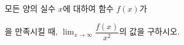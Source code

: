 모든 양의 실수 $x$에 대하여 함수 $f(x)$가\par\smallskip{}\par\smallskip\noindent 을 만족시킬 때, $\displaystyle\lim_{x\to\infty}\dfrac{f(x)}{x^2}$의 값을 구하시오.
